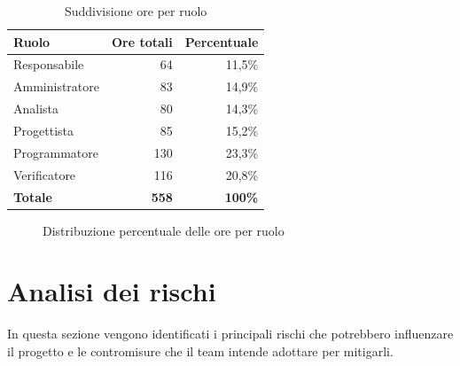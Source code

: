 \documentclass[11pt,a4paper]{article}
\begin{document}
\begin{table}[H]
    \centering
    \begin{tabular}{|l|r|r|}
        \hline
        \textbf{Ruolo} & \textbf{Ore totali} & \textbf{Percentuale} \\
        \hline
        Responsabile & 64 & 11,5\% \\
        \hline
        Amministratore & 83 & 14,9\% \\
        \hline
        Analista & 80 & 14,3\% \\
        \hline
        Progettista & 85 & 15,2\% \\
        \hline
        Programmatore & 130 & 23,3\% \\
        \hline
        Verificatore & 116 & 20,8\% \\
        \hline
        \textbf{Totale} & \textbf{558} & \textbf{100\%} \\
        \hline
    \end{tabular}
    \caption{Suddivisione ore per ruolo}
    \label{tab:ore_ruolo}
\end{table}

\vspace{1cm}

\begin{figure}[H]
    \centering
    \caption{Distribuzione percentuale delle ore per ruolo}
    \label{fig:torta_ruoli}
\end{figure}

\vspace{1cm}

\section{Analisi dei rischi}
In questa sezione vengono identificati i principali rischi che potrebbero influenzare il progetto e le contromisure che il team intende adottare per mitigarli.
\end{document}
